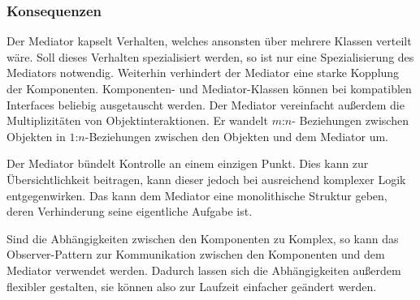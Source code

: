 \subsubsection*{Konsequenzen}

Der Mediator kapselt Verhalten, welches ansonsten über mehrere Klassen verteilt wäre. Soll dieses Verhalten spezialisiert werden, so ist nur eine Spezialisierung des Mediators notwendig. Weiterhin verhindert der Mediator eine starke Kopplung der Komponenten. Komponenten- und Mediator-Klassen können bei kompatiblen Interfaces beliebig ausgetauscht werden. Der Mediator vereinfacht außerdem die Multiplizitäten von Objektinteraktionen. Er wandelt $m$:$n$- Beziehungen zwischen Objekten in $1$:$n$-Beziehungen zwischen den Objekten und dem Mediator um. 

Der Mediator bündelt Kontrolle an einem einzigen Punkt. Dies kann zur Übersichtlichkeit beitragen, kann dieser jedoch bei ausreichend komplexer Logik entgegenwirken. Das kann dem Mediator eine monolithische Struktur geben, deren Verhinderung seine eigentliche Aufgabe ist. 

Sind die Abhängigkeiten zwischen den Komponenten zu Komplex, so kann das Observer-Pattern zur Kommunikation zwischen den Komponenten und dem Mediator verwendet werden. Dadurch lassen sich die Abhängigkeiten außerdem flexibler gestalten, sie können also zur Laufzeit einfacher geändert werden.